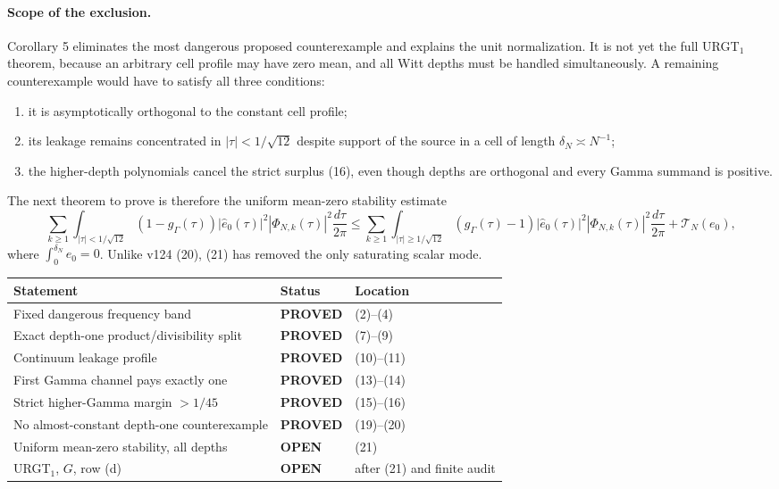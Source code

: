 \documentclass[11pt]{article}
\newcommand{\PROVED}{\textcolor{green!40!black}{\textbf{PROVED}}}
\newcommand{\OPEN}{\textcolor{red!70!black}{\textbf{OPEN}}}
\begin{document}
\paragraph{Scope of the exclusion.}
Corollary 5 eliminates the most dangerous proposed counterexample and
explains the unit normalization.  It is not yet the full URGT$_1$ theorem,
because an arbitrary cell profile may have zero mean, and all Witt depths
must be handled simultaneously.  A remaining counterexample would have
to satisfy all three conditions:
\begin{enumerate}
 \item it is asymptotically orthogonal to the constant cell profile;
 \item its leakage remains concentrated in $|\tau|<1/\sqrt{12}$ despite
       support of the source in a cell of length $\delta_N\asymp N^{-1}$;
 \item the higher-depth polynomials cancel the strict surplus (16), even
       though depths are orthogonal and every Gamma summand is positive.
\end{enumerate}
The next theorem to prove is therefore the uniform mean-zero stability
estimate
\begin{equation}
 \boxed{
 \sum_{k\ge1}\int_{|\tau|<1/\sqrt{12}}
 (1-g_\Gamma(\tau))
 |\widehat e_0(\tau)|^2|\Phi_{N,k}(\tau)|^2\frac{d\tau}{2\pi}
 \le
 \sum_{k\ge1}\int_{|\tau|\ge1/\sqrt{12}}
 (g_\Gamma(\tau)-1)
 |\widehat e_0(\tau)|^2|\Phi_{N,k}(\tau)|^2\frac{d\tau}{2\pi}
 +\mathcal T_N(e_0),}                                      \tag{21}
\end{equation}
where $\int_0^{\delta_N}e_0=0$.  Unlike v124 (20), (21) has removed the
only saturating scalar mode.

\begin{center}
\begin{tabular}{>{\raggedright\arraybackslash}p{.57\linewidth}
                >{\centering\arraybackslash}p{.14\linewidth}
                >{\raggedright\arraybackslash}p{.19\linewidth}}
\toprule
Statement & Status & Location \\
\midrule
Fixed dangerous frequency band & \PROVED & (2)--(4) \\
Exact depth-one product/divisibility split & \PROVED & (7)--(9) \\
Continuum leakage profile & \PROVED & (10)--(11) \\
First Gamma channel pays exactly one & \PROVED & (13)--(14) \\
Strict higher-Gamma margin $>1/45$ & \PROVED & (15)--(16) \\
No almost-constant depth-one counterexample & \PROVED & (19)--(20) \\
Uniform mean-zero stability, all depths & \OPEN & (21) \\
URGT$_1$, $G$, row (d) & \OPEN & after (21) and finite audit \\
\bottomrule
\end{tabular}
\end{center}
\end{document}
